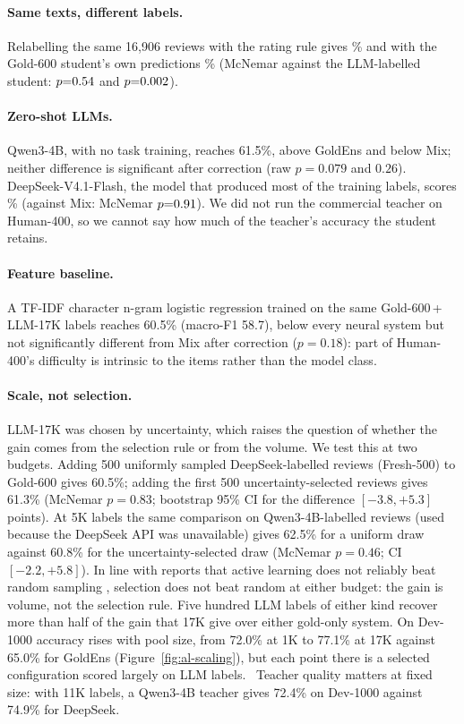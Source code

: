 \ifStwo
\paragraph{Same texts, different labels.}
Relabelling the same 16{,}906 reviews with the rating rule gives
\SwapStarAcc\% and with the Gold-600 student's own predictions
\SwapPseudoAcc\% (McNemar against the LLM-labelled student:
$p{=}0.54$ and $p{=}0.002$). \StwoInterp
\fi

\paragraph{Zero-shot LLMs.}
Qwen3-4B, with no task training, reaches 61.5\%, above GoldEns and
below Mix; neither difference is significant after correction (raw
$p{=}0.079$ and $0.26$).
\ifSone DeepSeek-V4.1-Flash, the model that produced most of the
training labels, scores \DSFlashAcc\% (against Mix: McNemar
$p{=}0.91$). \SoneInterp
\else We did not run the commercial teacher on Human-400, so we
cannot say how much of the teacher's accuracy the student
retains.\fi

\paragraph{Feature baseline.}
A TF-IDF character n-gram logistic regression trained on the same
Gold-600\,+\,LLM-17K labels reaches 60.5\% (macro-F1 58.7), below
every neural system but not significantly different from Mix after
correction ($p{=}0.18$): part of Human-400's difficulty is intrinsic
to the items rather than the model class.

\paragraph{Scale, not selection.}
LLM-17K was chosen by uncertainty, which raises the question of
whether the gain comes from the selection rule or from the volume.
We test this at two budgets. Adding 500 uniformly sampled
DeepSeek-labelled reviews (Fresh-500) to Gold-600 gives 60.5\%;
adding the first 500 uncertainty-selected reviews gives 61.3\%
(McNemar $p{=}0.83$; bootstrap 95\% CI for the difference
$[-3.8, +5.3]$ points). At 5K labels the same comparison on
Qwen3-4B-labelled reviews (used because the DeepSeek API was
unavailable) gives 62.5\% for a uniform draw against 60.8\% for the
uncertainty-selected draw (McNemar $p{=}0.46$; CI $[-2.2, +5.8]$).
In line with reports that active learning does not reliably beat
random sampling \citep{lowell2019}, selection does not beat random
at either budget: the gain is volume, not the selection rule. Five
hundred LLM labels of either kind recover more than half of the gain
that 17K give over either gold-only system.
\ifSthree \CurveSentence
\else On Dev-1000 accuracy rises with pool size, from 72.0\% at 1K to
77.1\% at 17K against 65.0\% for GoldEns
(Figure~\ref{fig:al-scaling}), but each point there is a
selected configuration scored largely on LLM labels.\fi
\ Teacher quality matters at fixed size: with 11K labels, a
Qwen3-4B teacher gives 72.4\% on Dev-1000 against 74.9\% for
DeepSeek.

